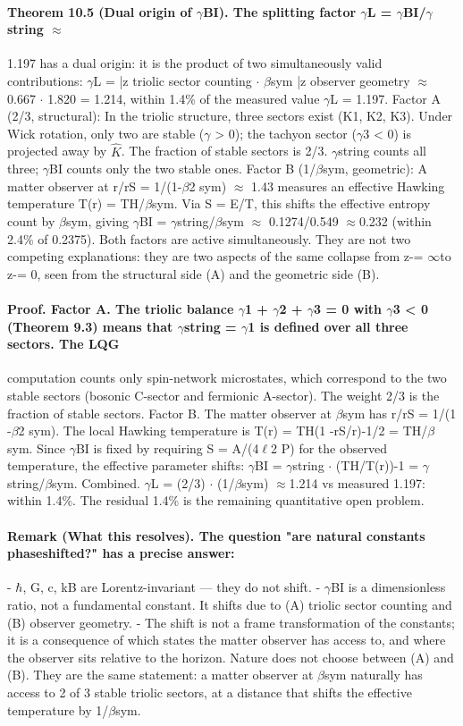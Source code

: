 \documentclass[12pt,a4paper]{article}
\begin{document}
\paragraph*{Theorem 10.5 (Dual origin of $\gamma$BI). The splitting factor $\gamma$L = $\gamma$BI/$\gamma$string $\approx$}
1.197 has a dual origin: it is the product of two simultaneously valid contributions:
$\gamma$L = |{z} triolic sector counting $\cdot$ $\beta$sym |{z} observer geometry $\approx$0.667 $\cdot$ 1.820 = 1.214, within 1.4\% of the measured value $\gamma$L = 1.197. Factor A (2/3, structural): In the triolic structure, three sectors exist (K1, K2, K3). Under Wick rotation, only two are stable ($\gamma$ > 0); the tachyon sector ($\gamma$3 < 0) is projected away by $\hat K$. The fraction of stable sectors is 2/3. $\gamma$string counts all three; $\gamma$BI counts only the two stable ones. Factor B (1/$\beta$sym, geometric): A matter observer at r/rS = 1/(1-$\beta$2 sym) $\approx$
1.43 measures an effective Hawking temperature T(r) = TH/$\beta$sym. Via S =
E/T, this shifts the effective entropy count by $\beta$sym, giving $\gamma$BI = $\gamma$string/$\beta$sym $\approx$
0.1274/0.549 $\approx$0.232 (within 2.4\% of 0.2375).
Both factors are active simultaneously. They are not two competing explanations: they are two aspects of the same collapse from z-= $\infty$to z-= 0, seen from the structural side (A) and the geometric side (B).
\paragraph*{Proof. Factor A. The triolic balance $\gamma$1 + $\gamma$2 + $\gamma$3 = 0 with $\gamma$3 < 0 (Theorem 9.3) means that $\gamma$string = $\gamma$1 is defined over all three sectors. The LQG}
computation counts only spin-network microstates, which correspond to the two stable sectors (bosonic C-sector and fermionic A-sector). The weight 2/3 is the fraction of stable sectors. Factor B. The matter observer at $\beta$sym has r/rS = 1/(1 -$\beta$2 sym). The local Hawking temperature is T(r) = TH(1 -rS/r)-1/2 = TH/$\beta$sym. Since $\gamma$BI is fixed by requiring S = A/(4$\ell$2 P) for the observed temperature, the effective parameter shifts: $\gamma$BI = $\gamma$string $\cdot$ (TH/T(r))-1 = $\gamma$string/$\beta$sym. Combined. $\gamma$L = (2/3) $\cdot$ (1/$\beta$sym) $\approx$1.214 vs measured 1.197: within 1.4\%. The residual 1.4\% is the remaining quantitative open problem.
\paragraph*{Remark (What this resolves). The question "are natural constants phaseshifted?" has a precise answer:}
- $\hbar$, G, c, kB are Lorentz-invariant --- they do not shift.
- $\gamma$BI is a dimensionless ratio, not a fundamental constant. It shifts due to
(A) triolic sector counting and (B) observer geometry.
- The shift is not a frame transformation of the constants; it is a consequence of which states the matter observer has access to, and where the
observer sits relative to the horizon. Nature does not choose between (A) and (B). They are the same statement: a matter observer at $\beta$sym naturally has access to 2 of 3 stable triolic sectors, at a distance that shifts the effective temperature by 1/$\beta$sym.
\end{document}
